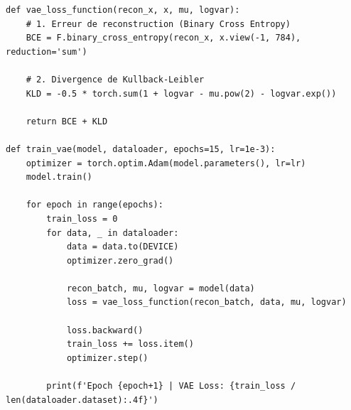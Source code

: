\documentclass[11pt,a4paper]{report}
\begin{document}
\begin{lstlisting}[caption=Fonction de Perte Composite (KL + BCE) et Entraînement]
def vae_loss_function(recon_x, x, mu, logvar):
    # 1. Erreur de reconstruction (Binary Cross Entropy)
    BCE = F.binary_cross_entropy(recon_x, x.view(-1, 784), reduction='sum')
    
    # 2. Divergence de Kullback-Leibler
    KLD = -0.5 * torch.sum(1 + logvar - mu.pow(2) - logvar.exp())
    
    return BCE + KLD

def train_vae(model, dataloader, epochs=15, lr=1e-3):
    optimizer = torch.optim.Adam(model.parameters(), lr=lr)
    model.train()
    
    for epoch in range(epochs):
        train_loss = 0
        for data, _ in dataloader:
            data = data.to(DEVICE)
            optimizer.zero_grad()
            
            recon_batch, mu, logvar = model(data)
            loss = vae_loss_function(recon_batch, data, mu, logvar)
            
            loss.backward()
            train_loss += loss.item()
            optimizer.step()
            
        print(f'Epoch {epoch+1} | VAE Loss: {train_loss / len(dataloader.dataset):.4f}')
\end{lstlisting}
\end{document}
